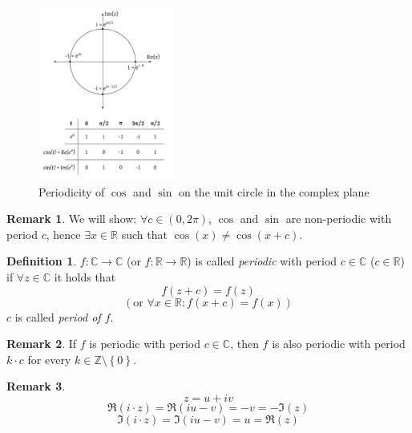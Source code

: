 \documentclass[a4paper,landscape,twocolumn]{article}
\theoremstyle{definition}
\newtheorem{defi}{Definition}
\newtheorem{rem}{Remark}
\newcommand\set[1]{\left\{#1\right\}}
\begin{document}
\begin{figure}[p]
  \begin{center}
    \includegraphics[width=0.4\textwidth]{img/trigonometric-periodicity.pdf}
    \caption{Periodicity of $\cos$ and $\sin$ on the unit circle in the complex plane}
    \label{fig:unitcircle}
  \end{center}
\end{figure}

\begin{rem}
  We will show: $\forall c \in (0, 2\pi)$, $\cos$ and $\sin$ are non-periodic with period $c$,
  hence $\exists x \in \mathbb R$ such that $\cos(x) \neq \cos(x + c)$.
\end{rem}

\begin{defi}
  $f: \mathbb C \to \mathbb C$ (or $f: \mathbb R \to \mathbb R$)
  is called \emph{periodic} with period $c \in \mathbb C$ ($c \in \mathbb R$)
  if $\forall z \in \mathbb C$ it holds that
  \[ f(z + c) = f(z) \]
  \[ (\text{or } \forall x \in \mathbb R: f(x + c) = f(x)) \]
  $c$ is called \emph{period of $f$}.
\end{defi}

\begin{rem}
  If $f$ is periodic with period $c \in \mathbb C$,
  then $f$ is also periodic with period $k \cdot c$ for every $k \in \mathbb Z \setminus \set{0}$.
\end{rem}

\begin{rem}
  \[ z = u + iv \]
  \[ \Re(i \cdot z) = \Re(i u - v) = -v = - \Im(z) \]
  \[ \Im(i \cdot z) = \Im(iu - v) = u = \Re(z) \]
\end{rem}
\end{document}
